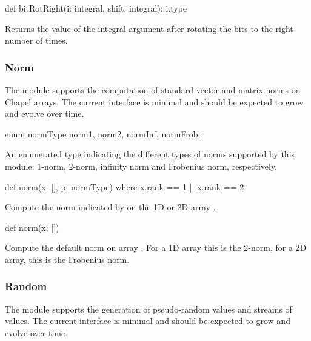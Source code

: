 \begin{protohead}
def bitRotRight(i: integral, shift: integral): i.type
\end{protohead}
\begin{protobody}
Returns the value of the integral argument  after rotating the
bits to the right  number of times.
\end{protobody}


\subsubsection{Norm}
\label{Norm}

The module  supports the computation of standard vector and
matrix norms on Chapel arrays.  The current interface is minimal and
should be expected to grow and evolve over time.

\begin{protohead}
enum normType {norm1, norm2, normInf, normFrob};
\end{protohead}
\begin{protobody}
An enumerated type indicating the different types of norms supported
by this module: 1-norm, 2-norm, infinity norm and Frobenius norm,
respectively.
\end{protobody}

\begin{protohead}
def norm(x: [], p: normType) where x.rank == 1 || x.rank == 2
\end{protohead}
\begin{protobody}
Compute the norm indicated by  on the 1D or 2D array .
\end{protobody}

\begin{protohead}
def norm(x: [])
\end{protohead}
\begin{protobody}
Compute the default norm on array .  For a 1D array this is
the 2-norm, for a 2D array, this is the Frobenius norm.
\end{protobody}


\subsubsection{Random}
\label{Random}

The module  supports the generation of pseudo-random
values and streams of values.  The current interface is minimal and
should be expected to grow and evolve over time.

